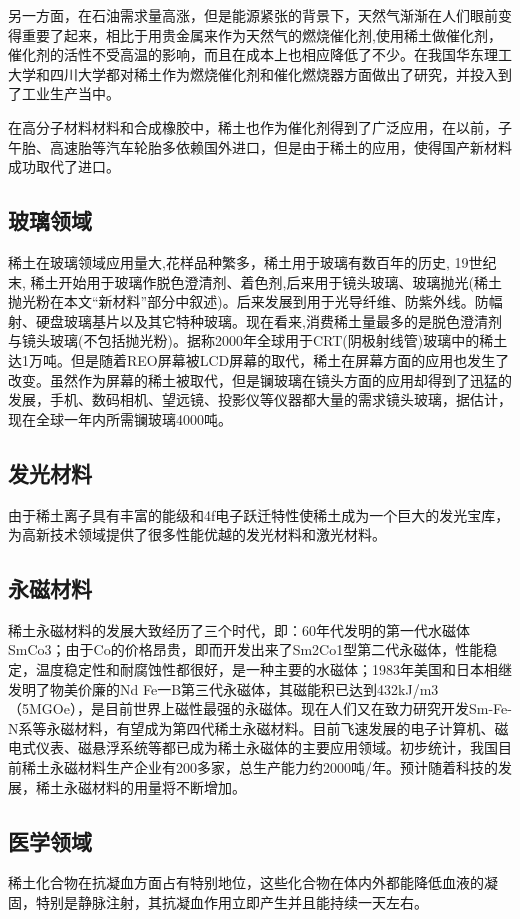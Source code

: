 \documentclass[twoside,twocolumn]{article}
\begin{document}
另一方面，在石油需求量高涨，但是能源紧张的背景下，天然气渐渐在人们眼前变得重要了起来，相比于用贵金属来作为天然气的燃烧催化剂,使用稀土做催化剂，催化剂的活性不受高温的影响，而且在成本上也相应降低了不少。在我国华东理工大学和四川大学都对稀土作为燃烧催化剂和催化燃烧器方面做出了研究，并投入到了工业生产当中。

在高分子材料材料和合成橡胶中，稀土也作为催化剂得到了广泛应用，在以前，子午胎、高速胎等汽车轮胎多依赖国外进口，但是由于稀土的应用，使得国产新材料成功取代了进口。
\subsection{玻璃领域}
稀土在玻璃领域应用量大,花样品种繁多，稀土用于玻璃有数百年的历史, 19世纪末, 稀土开始用于玻璃作脱色澄清剂、着色剂,后来用于镜头玻璃、玻璃抛光(稀土抛光粉在本文“新材料”部分中叙述)。后来发展到用于光导纤维、防紫外线。防幅射、硬盘玻璃基片以及其它特种玻璃。现在看来,消费稀土量最多的是脱色澄清剂与镜头玻璃(不包括抛光粉)。据称2000年全球用于CRT(阴极射线管)玻璃中的稀土达1万吨。但是随着REO屏幕被LCD屏幕的取代，稀土在屏幕方面的应用也发生了改变。虽然作为屏幕的稀土被取代，但是镧玻璃在镜头方面的应用却得到了迅猛的发展，手机、数码相机、望远镜、投影仪等仪器都大量的需求镜头玻璃，据估计，现在全球一年内所需镧玻璃4000吨。\cite{RN2}

\subsection{发光材料}
由于稀土离子具有丰富的能级和4f电子跃迁特性使稀土成为一个巨大的发光宝库，为高新技术领域提供了很多性能优越的发光材料和激光材料。
\subsection{永磁材料}
稀土永磁材料的发展大致经历了三个时代，即：60年代发明的第一代水磁体SmCo3；由于Co的价格昂贵，即而开发出来了Sm2Co1型第二代永磁体，性能稳定，温度稳定性和耐腐蚀性都很好，是一种主要的水磁体；1983年美国和日本相继发明了物美价廉的Nd Fe一B第三代永磁体，其磁能积已达到432kJ/m3（5MGOe），是目前世界上磁性最强的永磁体。现在人们又在致力研究开发Sm-Fe-N系等永磁材料，有望成为第四代稀土永磁材料。\cite{RN13}目前飞速发展的电子计算机、磁电式仪表、磁悬浮系统等都已成为稀土永磁体的主要应用领域。初步统计，我国目前稀土永磁材料生产企业有200多家，总生产能力约2000吨/年。预计随着科技的发展，稀土永磁材料的用量将不断增加。
\subsection{医学领域}
稀土化合物在抗凝血方面占有特别地位，这些化合物在体内外都能降低血液的凝固，特别是静脉注射，其抗凝血作用立即产生并且能持续一天左右。\cite{RN16}
\end{document}
